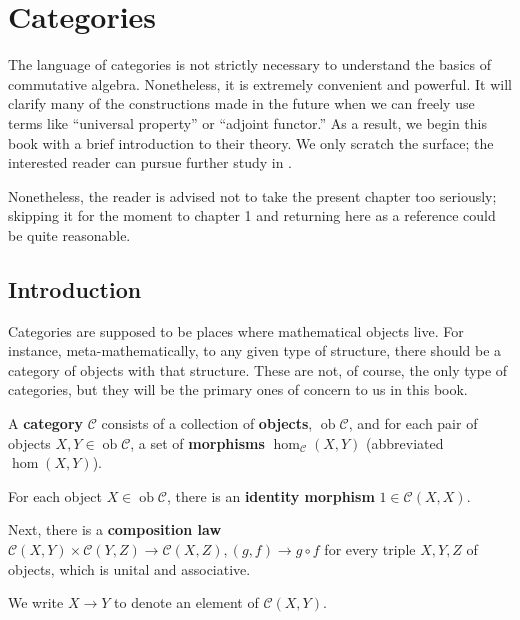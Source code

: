 \setcounter{chapter}{-1}
\chapter{Categories}
\label{categorychapter}


The language of categories is not strictly necessary to understand the basics
of  commutative
algebra. Nonetheless, it is extremely convenient and powerful. It will clarify
many of the constructions made in the future when we can freely use terms like
``universal property'' or ``adjoint functor.'' As a result, we begin this book
with a brief introduction to their theory. We only scratch the surface; the
interested reader can pursue further study in \cite{Ma98}.

Nonetheless, the reader is advised not to take the present chapter too
seriously; skipping it for the moment to chapter 1 and returning here as a
reference could be quite reasonable. 

\section{Introduction}
\newcommand{\ob}{\operatorname{ob}}

Categories are supposed to be places where mathematical objects live. For
instance, meta-mathematically, to any given type of structure, there should be a
category of objects with that structure. These are not, of course, the only
type of categories, but they will be the primary ones of concern to us in this
book.

\begin{definition} 
A \textbf{category} $\mathcal{C}$ consists of a collection of \textbf{objects},
$\ob \mathcal{C}$, and for each pair of objects $X, Y \in
\ob \mathcal{C}$, a set
of \textbf{morphisms} $\hom_{\mathcal{C}}(X, Y)$ (abbreviated $\hom(X,Y)$). 

For each object $X \in \ob\mathcal{C}$, there is an \textbf{identity morphism}
$1 \in \mathcal{C}(X, X)$. 

Next, there is a \textbf{composition law}
$\mathcal{C}(X, Y) \times \mathcal{C}(Y, Z) \to \mathcal{C}(X, Z), (g, f) \to g
\circ f$ for every
triple $X, Y, Z$ of objects, which is unital and associative. 

We write $X \to Y$ to denote an element of $\mathcal{C}(X, Y)$.
\end{definition} 

